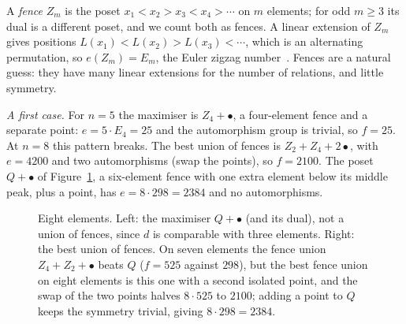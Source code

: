 \documentclass[11pt]{amsart}
\theoremstyle{remark}
\begin{document}
A \emph{fence} $Z_m$ is the poset $x_1<x_2>x_3<x_4>\cdots$ on $m$ elements; for odd $m\ge3$ its dual is a different poset, and we count both as fences. A linear extension of $Z_m$ gives positions $L(x_1)<L(x_2)>L(x_3)<\cdots$, which is an alternating permutation, so $e(Z_m)=E_m$, the Euler zigzag number~\cite{St}. Fences are a natural guess: they have many linear extensions for the number of relations, and little symmetry.

\emph{A first case.} For $n=5$ the maximiser is $Z_4+\bullet$, a four-element fence and a separate point: $e=5\cdot E_4=25$ and the automorphism group is trivial, so $f=25$. At $n=8$ this pattern breaks. The best union of fences is $Z_2+Z_4+2\bullet$, with $e=4200$ and two automorphisms (swap the points), so $f=2100$. The poset $Q+\bullet$ of Figure~\ref{fig:Q}, a six-element fence with one extra element below its middle peak, plus a point, has $e=8\cdot298=2384$ and no automorphisms.

\begin{figure}[ht]
\centering
{}
\caption{Eight elements. Left: the maximiser $Q+\bullet$ (and its dual), not a union of fences, since $d$ is comparable with three elements. Right: the best union of fences. On seven elements the fence union $Z_4+Z_2+\bullet$ beats $Q$ ($f=525$ against $298$), but the best fence union on eight elements is this one with a second isolated point, and the swap of the two points halves $8\cdot525$ to $2100$; adding a point to $Q$ keeps the symmetry trivial, giving $8\cdot298=2384$.}
\label{fig:Q}
\end{figure}
\end{document}
